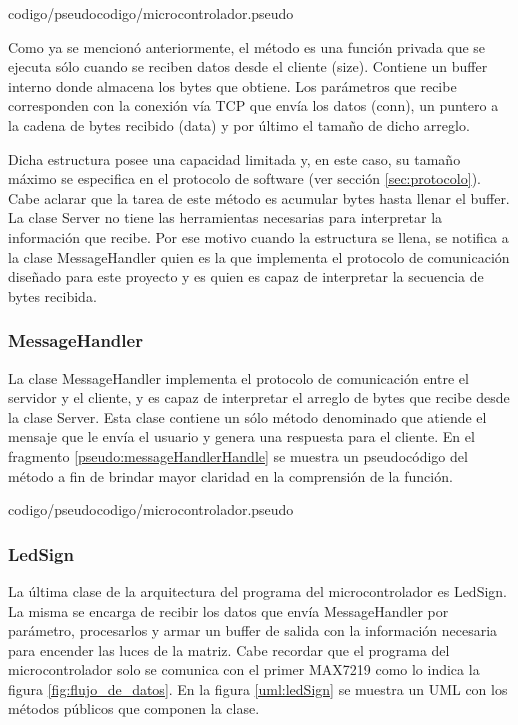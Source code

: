  {codigo/pseudocodigo/microcontrolador.pseudo}

Como ya se mencionó anteriormente, el método  es una función privada que se ejecuta sólo cuando se reciben datos desde el cliente (size).
Contiene un buffer interno donde almacena los bytes que obtiene.
Los parámetros que recibe corresponden con la conexión vía TCP que envía los datos (conn), un puntero a la cadena de bytes recibido (data) y por último el tamaño de dicho arreglo.

Dicha estructura posee una capacidad limitada y, en este caso, su tamaño máximo se especifica en el protocolo de software (ver sección \ref{sec:protocolo}).
Cabe aclarar que la tarea de este método es acumular bytes hasta llenar el buffer. La clase Server no tiene las herramientas necesarias para interpretar la información que recibe.
Por ese motivo cuando la estructura se llena, se notifica a la clase MessageHandler quien es la que implementa el protocolo de comunicación diseñado para este proyecto y es quien es capaz de interpretar la secuencia de bytes recibida.



\subsubsection{MessageHandler}

La clase MessageHandler implementa el protocolo de comunicación entre el servidor y el cliente, y es capaz de interpretar el arreglo de bytes que recibe desde la clase Server.
Esta clase contiene un sólo método denominado  que atiende el mensaje que le envía el usuario y genera una respuesta para el cliente.
En el fragmento \ref{pseudo:messageHandlerHandle} se muestra un pseudocódigo del método a fin de brindar mayor claridad en la comprensión de la función.

 {codigo/pseudocodigo/microcontrolador.pseudo}



\subsubsection{LedSign}

La última clase de la arquitectura del programa del microcontrolador es LedSign.
La misma se encarga de recibir los datos que envía MessageHandler por parámetro, procesarlos y armar un buffer de salida con la información necesaria para encender las luces de la matriz.
Cabe recordar que el programa del microcontrolador solo se comunica con el primer MAX7219 como lo indica la figura \ref{fig:flujo_de_datos}.
En la figura \ref{uml:ledSign} se muestra un UML con los métodos públicos que componen la clase.

